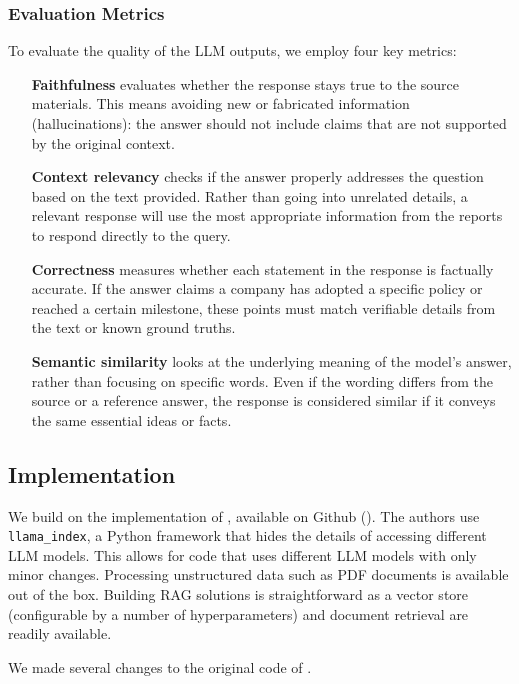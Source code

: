 \documentclass[]{article}
\begin{document}
\subsubsection{Evaluation Metrics}
To evaluate the quality of the LLM outputs, we employ four key metrics:
\begin{itemize}
    \item [\textbf{Faithfulness}] evaluates whether the response stays true to the source materials. This means avoiding new or fabricated information (hallucinations): the answer should not include claims that are not supported by the original context.
    \item [\textbf{Context relevancy}] checks if the answer properly addresses the question based on the text provided. Rather than going into unrelated details, a relevant response will use the most appropriate information from the reports to respond directly to the query.
    \item [\textbf{Correctness}] measures whether each statement in the response is factually accurate. If the answer claims a company has adopted a specific policy or reached a certain milestone, these points must match verifiable details from the text or known ground truths.
    \item [\textbf{Semantic similarity}] looks at the underlying meaning of the model’s answer, rather than focusing on specific words. Even if the wording differs from the source or a reference answer, the response is considered similar if it conveys the same essential ideas or facts.
\end{itemize}

\subsection{Implementation}

We build on the implementation of \cite{durability}, available on Github (\cite{github-orig}).
The authors use \texttt{llama\_index}, a Python framework that hides the details of accessing different LLM models.
This allows for code that uses different LLM models with only minor changes.
Processing unstructured data such as PDF documents is available out of the box.
Building RAG solutions is straightforward as a vector store (configurable by a number of hyperparameters) and document retrieval are readily available.

We made several changes to the original code of \cite{durability}.
\end{document}
